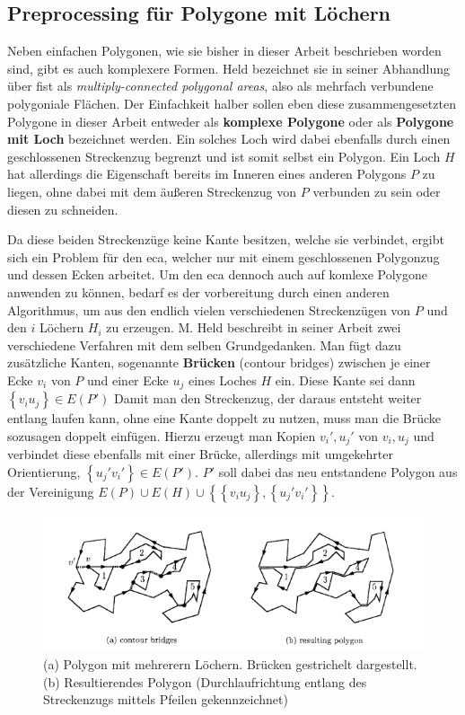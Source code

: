 \subsection{Preprocessing für Polygone mit Löchern}

Neben einfachen Polygonen, wie sie bisher in dieser Arbeit beschrieben worden sind, gibt es auch komplexere Formen. Held bezeichnet sie in seiner Abhandlung über \ac{fist} als \emph{multiply-connected polygonal areas}, 
also als mehrfach verbundene polygoniale Flächen.\cite{fist} Der Einfachkeit halber sollen eben diese zusammengesetzten Polygone in dieser Arbeit entweder als \textbf{komplexe Polygone} oder als \textbf{Polygone mit Loch} bezeichnet werden.
Ein solches Loch wird dabei ebenfalls durch einen geschlossenen Streckenzug begrenzt und ist somit selbst ein Polygon. Ein Loch $H$ hat allerdings die Eigenschaft bereits im Inneren eines anderen Polygons $P$ zu liegen, ohne dabei mit dem äußeren 
Streckenzug von $P$ verbunden zu sein oder diesen zu schneiden. 

Da diese beiden Streckenzüge keine Kante besitzen, welche sie verbindet, ergibt sich ein Problem für den \ac{eca}, welcher nur mit einem geschlossenen Polygonzug und dessen Ecken arbeitet. Um den \ac{eca} dennoch auch auf komlexe Polygone anwenden zu können,
bedarf es der vorbereitung durch einen anderen Algorithmus, um aus den endlich vielen verschiedenen Streckenzügen von $P$ und den $i$ Löchern $H_i$ zu erzeugen.
M. Held beschreibt in seiner Arbeit zwei verschiedene Verfahren mit dem selben Grundgedanken. Man fügt dazu zusätzliche Kanten, sogenannte \textbf{Brücken} (contour bridges) zwischen je einer Ecke $v_i$ von $P$ und einer Ecke $u_j$ eines Loches $H$ ein. Diese Kante sei dann $\left\{v_iu_j\right\} \in E(P')$
Damit man den Streckenzug, der daraus entsteht weiter entlang laufen kann, ohne eine Kante doppelt zu nutzen, muss man die Brücke sozusagen doppelt einfügen. Hierzu erzeugt man Kopien $v_i', u_j'$ von $v_i, u_j$ und verbindet diese ebenfalls mit einer Brücke, 
allerdings mit umgekehrter Orientierung, $\left\{u_j'v_i'\right\} \in E(P')$. $P'$ soll dabei das neu entstandene Polygon aus der Vereinigung $E(P)\cup E(H) \cup \left\{ \left\{v_iu_j\right\},\left\{u_j'v_i'\right\} \right\} $.

\begin{figure}
  \centering
  \includegraphics[width=1\textwidth]{bilder/bridges.png}
  \caption[Vereinfachung eines Polygons mit mehreren Löchern zu einem einfachen Polygon]{\centering (a) Polygon mit mehrerern Löchern. Brücken gestrichelt dargestellt. (b) Resultierendes Polygon (Durchlaufrichtung entlang des Streckenzugs mittels Pfeilen gekennzeichnet)\cite{fist}}
  \label{fig:bridges}
\end{figure}


